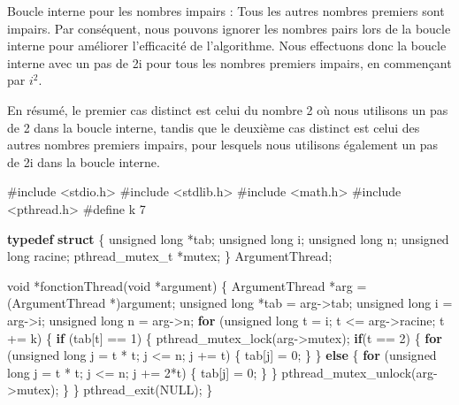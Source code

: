 \documentclass[
    ]{article}
\newenvironment{Shaded}{}{}
\newcommand{\ControlFlowTok}[1]{\textcolor[rgb]{0.00,0.44,0.13}{\textbf{#1}}}
\newcommand{\DataTypeTok}[1]{\textcolor[rgb]{0.56,0.13,0.00}{#1}}
\newcommand{\DecValTok}[1]{\textcolor[rgb]{0.25,0.63,0.44}{#1}}
\newcommand{\ImportTok}[1]{#1}
\newcommand{\KeywordTok}[1]{\textcolor[rgb]{0.00,0.44,0.13}{\textbf{#1}}}
\newcommand{\NormalTok}[1]{#1}
\newcommand{\PreprocessorTok}[1]{\textcolor[rgb]{0.74,0.48,0.00}{#1}}
\begin{document}
Boucle interne pour les nombres impairs : Tous les autres nombres
premiers sont impairs. Par conséquent, nous pouvons ignorer les nombres
pairs lors de la boucle interne pour améliorer l'efficacité de
l'algorithme. Nous effectuons donc la boucle interne avec un pas de 2i
pour tous les nombres premiers impairs, en commençant par \(i^2\).

En résumé, le premier cas distinct est celui du nombre 2 où nous
utilisons un pas de 2 dans la boucle interne, tandis que le deuxième cas
distinct est celui des autres nombres premiers impairs, pour lesquels
nous utilisons également un pas de 2i dans la boucle interne.

\begin{Shaded}
\begin{Highlighting}[]
\PreprocessorTok{\#include }\ImportTok{\textless{}stdio.h\textgreater{}}
\PreprocessorTok{\#include }\ImportTok{\textless{}stdlib.h\textgreater{}}
\PreprocessorTok{\#include }\ImportTok{\textless{}math.h\textgreater{}}
\PreprocessorTok{\#include }\ImportTok{\textless{}pthread.h\textgreater{}}
\PreprocessorTok{\#define k 7}

\KeywordTok{typedef} \KeywordTok{struct}
\NormalTok{\{}
    \DataTypeTok{unsigned} \DataTypeTok{long}\NormalTok{ *tab;}
    \DataTypeTok{unsigned} \DataTypeTok{long}\NormalTok{ i;}
    \DataTypeTok{unsigned} \DataTypeTok{long}\NormalTok{ n;}
    \DataTypeTok{unsigned} \DataTypeTok{long}\NormalTok{ racine;}
\NormalTok{    pthread\_mutex\_t *mutex;}
\NormalTok{\} ArgumentThread;}

\DataTypeTok{void}\NormalTok{ *fonctionThread(}\DataTypeTok{void}\NormalTok{ *argument)}
\NormalTok{\{}
\NormalTok{    ArgumentThread *arg = (ArgumentThread *)argument;}
    \DataTypeTok{unsigned} \DataTypeTok{long}\NormalTok{ *tab = arg{-}\textgreater{}tab;}
    \DataTypeTok{unsigned} \DataTypeTok{long}\NormalTok{ i = arg{-}\textgreater{}i;}
    \DataTypeTok{unsigned} \DataTypeTok{long}\NormalTok{ n = arg{-}\textgreater{}n;}
    \ControlFlowTok{for}\NormalTok{ (}\DataTypeTok{unsigned} \DataTypeTok{long}\NormalTok{ t = i; t \textless{}= arg{-}\textgreater{}racine; t += k)}
\NormalTok{    \{}
        \ControlFlowTok{if}\NormalTok{ (tab[t] == }\DecValTok{1}\NormalTok{)}
\NormalTok{        \{}
\NormalTok{            pthread\_mutex\_lock(arg{-}\textgreater{}mutex);}
            \ControlFlowTok{if}\NormalTok{(t == }\DecValTok{2}\NormalTok{)}
\NormalTok{            \{}
                \ControlFlowTok{for}\NormalTok{ (}\DataTypeTok{unsigned} \DataTypeTok{long}\NormalTok{ j = t * t; j \textless{}= n; j += t)}
\NormalTok{                \{}
\NormalTok{                    tab[j] = }\DecValTok{0}\NormalTok{;}
\NormalTok{                \}}
\NormalTok{            \}}
            \ControlFlowTok{else}
\NormalTok{            \{}
                \ControlFlowTok{for}\NormalTok{ (}\DataTypeTok{unsigned} \DataTypeTok{long}\NormalTok{ j = t * t; j \textless{}= n; j += }\DecValTok{2}\NormalTok{*t)}
\NormalTok{                \{}
\NormalTok{                    tab[j] = }\DecValTok{0}\NormalTok{;}
\NormalTok{                \}}
\NormalTok{            \}}
\NormalTok{            pthread\_mutex\_unlock(arg{-}\textgreater{}mutex);}
\NormalTok{        \}}
\NormalTok{    \}}
\NormalTok{    pthread\_exit(NULL);}
\NormalTok{\}}


\end{Highlighting}
\end{Shaded}
\end{document}
